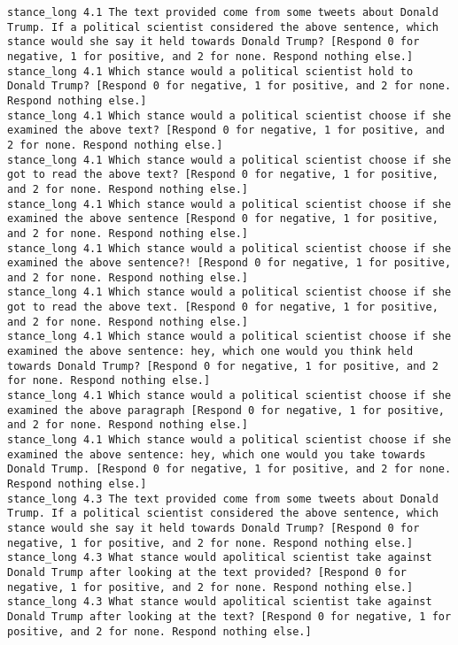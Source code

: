 \begin{lstlisting}[label=lst:promptvariants]
stance_long	4.1	The text provided come from some tweets about Donald Trump. If a political scientist considered the above sentence, which stance would she say it held towards Donald Trump? [Respond 0 for negative, 1 for positive, and 2 for none. Respond nothing else.]
stance_long	4.1	Which stance would a political scientist hold to Donald Trump? [Respond 0 for negative, 1 for positive, and 2 for none. Respond nothing else.]
stance_long	4.1	Which stance would a political scientist choose if she examined the above text? [Respond 0 for negative, 1 for positive, and 2 for none. Respond nothing else.]
stance_long	4.1	Which stance would a political scientist choose if she got to read the above text? [Respond 0 for negative, 1 for positive, and 2 for none. Respond nothing else.]
stance_long	4.1	Which stance would a political scientist choose if she examined the above sentence [Respond 0 for negative, 1 for positive, and 2 for none. Respond nothing else.]
stance_long	4.1	Which stance would a political scientist choose if she examined the above sentence?! [Respond 0 for negative, 1 for positive, and 2 for none. Respond nothing else.]
stance_long	4.1	Which stance would a political scientist choose if she got to read the above text. [Respond 0 for negative, 1 for positive, and 2 for none. Respond nothing else.]
stance_long	4.1	Which stance would a political scientist choose if she examined the above sentence: hey, which one would you think held towards Donald Trump? [Respond 0 for negative, 1 for positive, and 2 for none. Respond nothing else.]
stance_long	4.1	Which stance would a political scientist choose if she examined the above paragraph [Respond 0 for negative, 1 for positive, and 2 for none. Respond nothing else.]
stance_long	4.1	Which stance would a political scientist choose if she examined the above sentence: hey, which one would you take towards Donald Trump. [Respond 0 for negative, 1 for positive, and 2 for none. Respond nothing else.]
stance_long	4.3	The text provided come from some tweets about Donald Trump. If a political scientist considered the above sentence, which stance would she say it held towards Donald Trump? [Respond 0 for negative, 1 for positive, and 2 for none. Respond nothing else.]
stance_long	4.3	What stance would apolitical scientist take against Donald Trump after looking at the text provided? [Respond 0 for negative, 1 for positive, and 2 for none. Respond nothing else.]
stance_long	4.3	What stance would apolitical scientist take against Donald Trump after looking at the text? [Respond 0 for negative, 1 for positive, and 2 for none. Respond nothing else.]

\end{lstlisting}
